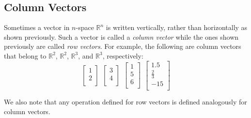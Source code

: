 \documentclass[../setup.tex]{subfiles}
\begin{document}
\subsection{Column Vectors}
Sometimes a vector in $n$-space $\mathbb{R}^n$ is written vertically, rather than horizontally as shown previously. Such a vector is called a \textit{column vector} while the ones shown previously are called \textit{row vectors}. For example, the following are column vectors that belong to $\mathbb{R}^2$, $\mathbb{R}^2$, $\mathbb{R}^3$, and $\mathbb{R}^3$, respectively:
\[
	\begin{bmatrix}
	1 \\
	2 \\
	\end{bmatrix}
\ \ 
	\begin{bmatrix}
	3 \\
	4 \\
	\end{bmatrix}
\ \
	\begin{bmatrix}
	1 \\
	5 \\
	6 \\
	\end{bmatrix}
\ \
	\begin{bmatrix}
	1.5 \\
	\frac{2}{3} \\
	-15 \\
	\end{bmatrix}
\]
\begin{remark}
We also note that any operation defined for row vectors is defined analogously for column vectors.
\end{remark}
\pagebreak
\end{document}
